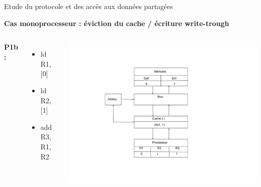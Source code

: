 \documentclass{beamer}
\begin{document}
\begin{frame}{Etude du protocole et des accès aux données partagées}
    \addtocounter{framenumber}{-1}
    \textbf{Cas monoprocesseur : éviction du cache / écriture write-trough}
    \begin{columns}[c] %

        \textbf{P1b : }
        \begin{itemize}
            \item ld R1, [0]
            \item ld R2, [1]
            \item add R3, R1, R2
        \end{itemize}

        \includegraphics[scale=0.28]{f3b.png}
        
    \end{columns}
\end{frame}
\end{document}
